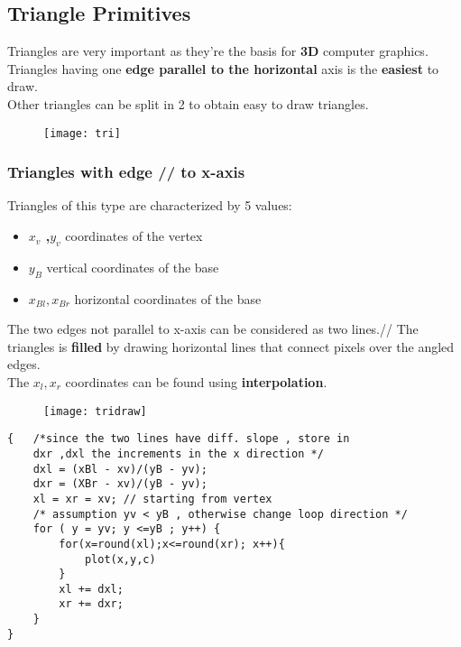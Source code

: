 \newpage
\subsection{Triangle Primitives}
Triangles are very important as they're the basis for \textbf{3D} computer graphics.
Triangles having one \textbf{edge parallel to the horizontal} axis is the \textbf{easiest} to draw.\\
Other triangles can be split in 2 to obtain easy to draw triangles.\\
\begin{figure}[H]
 \centering
  \texttt{[image: tri]}
\end{figure}
\subsubsection{Triangles with edge //  to x-axis}
Triangles of this type are characterized by 5 values:
\begin{itemize}
\item \textbf{$x_v$ ,$y_v$} coordinates of the vertex
\item \textbf{$y_B$} vertical coordinates of the base
\item \textbf{$x_{Bl},x_{Br}$} horizontal coordinates of the base
\end{itemize}
The two edges not parallel to x-axis can be considered as two lines.//
The triangles is \textbf{filled} by drawing horizontal lines that connect pixels over the angled edges.\\
The $x_l,x_r$ coordinates can be found using \textbf{interpolation}.
\begin{figure}[H]
 \centering
  \texttt{[image: tridraw]}
\end{figure}

\begin{lstlisting}
{	/*since the two lines have diff. slope , store in
	dxr ,dxl the increments in the x direction */
	dxl = (xBl - xv)/(yB - yv); 
	dxr = (XBr - xv)/(yB - yv); 
	xl = xr = xv; // starting from vertex
	/* assumption yv < yB , otherwise change loop direction */
	for ( y = yv; y <=yB ; y++) {
		for(x=round(xl);x<=round(xr); x++){
			plot(x,y,c)
		}
		xl += dxl;
		xr += dxr;
	}								
}
\end{lstlisting}

